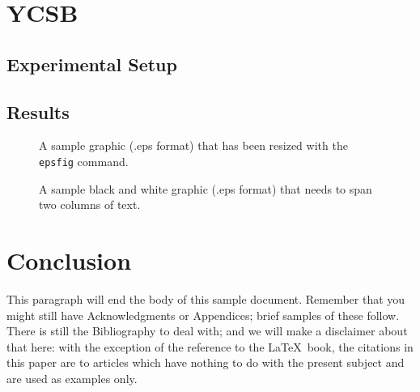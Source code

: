 \documentclass{sig-alternate}
\begin{document}
\section{YCSB}

\subsection{Experimental Setup}

\subsection{Results}
%

\begin{figure}
\centering
{}
\caption{A sample graphic (.eps format)
that has been resized with the \texttt{epsfig} command.}
\end{figure}


\begin{figure*}
\centering
{}
\caption{A sample black and white graphic (.eps format)
that needs to span two columns of text.}
\end{figure*}

\section{Conclusion}
This paragraph will end the body of this sample document.
Remember that you might still have Acknowledgments or
Appendices; brief samples of these
follow.  There is still the Bibliography to deal with; and
we will make a disclaimer about that here: with the exception
of the reference to the \LaTeX\ book, the citations in
this paper are to articles which have nothing to
do with the present subject and are used as
examples only.
\end{document}
